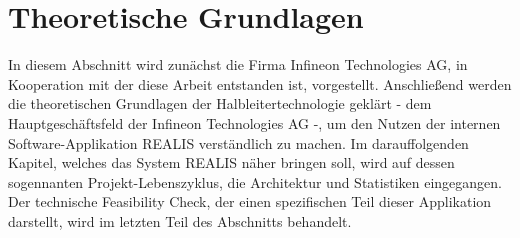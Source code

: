 \chapter{Theoretische Grundlagen}\label{Chap:TheoretischeGrundlagen}
In diesem Abschnitt wird zunächst die Firma Infineon Technologies AG, in Kooperation mit der diese Arbeit entstanden ist, vorgestellt. Anschließend werden die theoretischen Grundlagen der Halbleitertechnologie geklärt - dem Hauptgeschäftsfeld der Infineon Technologies AG -, um den Nutzen der internen Software-Applikation \gls{REALIS} verständlich zu machen. Im darauffolgenden Kapitel, welches das System \gls{REALIS} näher bringen soll, wird auf dessen sogennanten Projekt-Lebenszyklus, die Architektur und Statistiken eingegangen. Der technische Feasibility Check, der einen spezifischen Teil dieser Applikation darstellt, wird im letzten Teil des Abschnitts behandelt.




